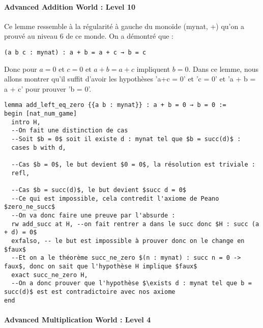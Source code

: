 \paragraph{Advanced Addition World : Level 10}

Ce lemme ressemble à la régularité à gauche du monoïde (mynat, +) qu'on a prouvé au niveau 6 de ce monde.
On a démontré que :
\begin{verbatim}
(a b c : mynat) : a + b = a + c → b = c
\end{verbatim}
Donc pour $a = 0$ et $c = 0$ et $a + b = a + c$ impliquent $b = 0$.
Dans ce lemme, nous allons montrer qu'il suffit d'avoir les hypothèses 'a+c = 0' et 'c = 0' et 'a + b = a + c' pour prouver 'b = 0'.

\begin{verbatim}
lemma add_left_eq_zero {{a b : mynat}} : a + b = 0 → b = 0 :=
begin [nat_num_game]
  intro H,
  --On fait une distinction de cas
  --Soit $b = 0$ soit il existe d : mynat tel que $b = succ(d)$ :
  cases b with d,

  --Cas $b = 0$, le but devient $0 = 0$, la résolution est triviale :
  refl,

  --Cas $b = succ(d)$, le but devient $succ d = 0$
  --Ce qui est impossible, cela contredit l'axiome de Peano $zero_ne_succ$
  --On va donc faire une preuve par l'absurde :
  rw add_succ at H, --on fait rentrer a dans le succ donc $H : succ (a + d) = 0$
  exfalso, -- le but est impossible à prouver donc on le change en $faux$
  --Et on a le théorème succ_ne_zero $(n : mynat) : succ n = 0 -> faux$, donc on sait que l'hypothèse H implique $faux$
  exact succ_ne_zero H,
  --On a donc prouver que l'hypothèse $\exists d : mynat tel que b = succ(d)$ est est contradictoire avec nos axiome
end
\end{verbatim}

\paragraph{Advanced Multiplication World : Level 4}


